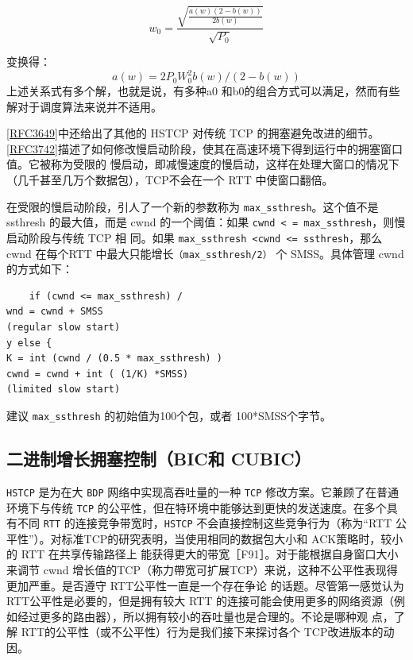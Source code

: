 \begin{equation}
    w_{0} = \frac{\sqrt{\frac{a(w)(2-b(w))}{2b(w)}}}{\sqrt{P_{0}}}
\end{equation}

变换得：
\begin{equation}
    a(w) = 2P_{0}W_{0}^2b(w)/(2-b(w))
\end{equation}
上述关系式有多个解，也就是说，有多种a0 和b0的组合方式可以满足，然而有些解对于调度算法来说并不适用。

\href{https://www.rfc-editor.org/rfc/rfc3649}{[RFC3649]}中还给出了其他的 HSTCP 对传统 TCP 的拥塞避免改进的细节。\href{https://www.rfc-editor.org/rfc/rfc3742}{[RFC3742]}描述了如何修改慢启动阶段，使其在高速环境下得到运行中的拥塞窗口值。它被称为受限的
慢启动，即减慢速度的慢启动，这样在处理大窗口的情况下（几千甚至几万个数据包），TCP不会在一个 RTT 中使窗口翻倍。

在受限的慢启动阶段，引人了一个新的参数称为 \verb|max_ssthresh|。这个值不是 ssthresh 的最大值，而是 cwnd 的一个阈值：如果 \verb|cwnd < = max_ssthresh|，则慢启动阶段与传统 TCP 相
同。如果 \verb|max_ssthresh <cwnd <= ssthresh|，那么 cwnd 在每个RTT 中最大只能增长\verb|（max_ssthresh/2）| 个 SMSS。具体管理 cwnd的方式如下：
\begin{verbatim}
    if (cwnd <= max_ssthresh) /
wnd = cwnd + SMSS
(regular slow start)
y else {
K = int (cwnd / (0.5 * max_ssthresh) )
cwnd = cwnd + int ( (1/K) *SMSS)
(limited slow start)
\end{verbatim}
建议 \verb|max_ssthresh| 的初始值为100个包，或者 100*SMSS个字节。

\subsection{二进制增长拥塞控制（BIC和 CUBIC）}
\verb|HSTCP| 是为在大 \verb|BDP| 网络中实现高吞吐量的一种 \verb|TCP| 修改方案。它兼顾了在普通环境下与传统 \verb|TCP| 的公平性，但在特环境中能够达到更快的发送速度。在多个具有不同 \verb|RTT|
的连接竞争带宽时，\verb|HSTCP| 不会直接控制这些竞争行为（称为“RTT 公平性”）。对标准TCP的研究表明，当使用相同的数据包大小和 ACK策略时，较小的 RTT 在共享传输路径上
能获得更大的带宽［F91］。对于能根据自身窗口大小来调节 cwnd 增长值的TCP（称力帶宽可扩展TCP）来说，这种不公平性表现得更加严重。是否遵守 RTT公平性一直是一个存在争论
的话题。尽管第一感觉认为 RTT公平性是必要的，但是拥有较大 RTT 的连接可能会使用更多的网络资源（例如经过更多的路由器），所以拥有较小的吞吐量也是合理的。不论是哪种观
点，了解 RTT的公平性（或不公平性）行为是我们接下来探讨各个 TCP改进版本的动因。

